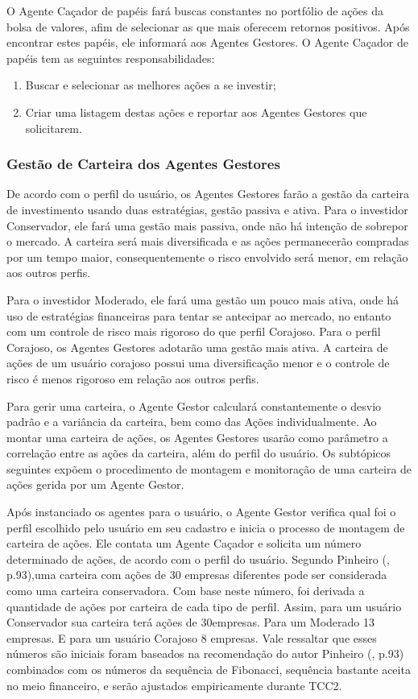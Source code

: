 O Agente Caçador de papéis fará buscas constantes no portfólio de ações da bolsa  de valores, afim de selecionar as que mais oferecem retornos positivos. Após encontrar estes papéis, ele informará aos Agentes Gestores. O Agente Caçador de papéis tem as seguintes responsabilidades: 
\begin{enumerate}
\item Buscar e selecionar as melhores ações a se investir;
\item Criar uma listagem destas ações e reportar aos Agentes Gestores que solicitarem.
\end{enumerate}

\subsubsection{Gestão de Carteira dos Agentes Gestores}

De acordo com o perfil do usuário, os Agentes Gestores farão a gestão da carteira de investimento usando duas estratégias, gestão passiva e ativa. Para o investidor Conservador, ele fará uma gestão mais passiva, onde não há intenção de sobrepor o mercado. A carteira será mais diversificada e as ações permanecerão compradas por um tempo maior, consequentemente o risco envolvido será menor, em relação aos outros perfis.

Para o investidor Moderado, ele fará uma gestão um pouco mais ativa, onde há uso de estratégias financeiras para tentar se antecipar ao mercado, no entanto com um controle de risco mais rigoroso do que perfil Corajoso. Para o perfil Corajoso, os Agentes Gestores adotarão uma gestão mais ativa. A carteira de ações de um usuário corajoso possui uma diversificação menor e o controle de risco é menos rigoroso em relação aos outros perfis.

Para gerir uma carteira, o Agente Gestor calculará constantemente o desvio padrão e a variância da carteira, bem como das Ações individualmente. Ao montar uma carteira de ações, os Agentes Gestores usarão como parâmetro a correlação entre as ações da carteira, além do perfil do usuário. Os subtópicos seguintes expõem o procedimento de montagem e monitoração de uma carteira de ações gerida por um Agente Gestor.


Após instanciado os agentes para o usuário, o Agente Gestor verifica qual foi o perfil escolhido pelo usuário em seu cadastro e inicia o processo de montagem de carteira de ações. Ele contata um Agente Caçador e solicita um número determinado de ações, de acordo com o perfil do usuário. Segundo Pinheiro (\citeyear{pinheiro2008}, p.93),uma carteira com ações de 30 empresas diferentes pode ser considerada como uma carteira conservadora. Com base neste número, foi derivada a quantidade de ações por carteira de cada tipo de perfil. Assim, para um usuário Conservador sua carteira terá ações de 30empresas. Para um Moderado 13 empresas. E para um usuário Corajoso 8 empresas. Vale ressaltar que esses números são iniciais foram baseados na recomendação do autor Pinheiro (\citeyear{pinheiro2008}, p.93) combinados com os números da sequência de Fibonacci, sequência bastante aceita no meio financeiro, e serão ajustados empiricamente durante TCC2.


